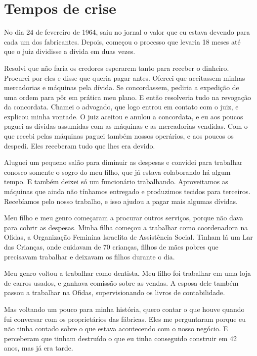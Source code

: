 \chapter{Tempos de crise}

No dia 24 de fevereiro de 1964, saiu no jornal o valor que eu estava
devendo para cada um dos fabricantes. Depois, começou o processo que 
levaria 18 meses até que o juiz dividisse a dívida em duas vezes.

Resolvi que não faria os credores esperarem tanto para receber
o dinheiro. Procurei por eles e disse que queria pagar antes. Ofereci que
aceitassem minhas mercadorias e máquinas pela dívida. Se concordassem, pediria a expedição de uma ordem para pôr em prática meu plano. E então resolveria tudo na revogação da
concordata. Chamei o advogado, que logo entrou em contato com o juiz, e explicou minha vontade. O juiz aceitou e anulou a concordata, e eu aos
poucos paguei as dívidas assumidas com as máquinas e as mercadorias vendidas.
Com o que recebi pelas máquinas paguei também nossos operários, e aos
poucos os despedi. Eles receberam tudo que lhes era devido. 

Aluguei um
pequeno salão para diminuir as despesas e convidei para trabalhar
conosco somente o sogro do
meu filho, que já estava colaborando há algum tempo. E também deixei só um funcionário trabalhando. Aproveitamos as
máquinas que ainda não tínhamos entregado e produzimos tecidos para
terceiros. Recebíamos pelo nosso trabalho, e isso ajudou a pagar mais
algumas dívidas.

Meu filho e meu genro começaram a procurar outros serviços, porque não
dava para cobrir as despesas. Minha filha começou a
trabalhar como coordenadora na Ofidas, a Organização Feminina Israelita de Assistência Social. Tinham lá um Lar das Crianças, onde cuidavam de 70 crianças, filhos de mães
pobres que precisavam trabalhar e deixavam os filhos durante o dia.

Meu genro voltou a trabalhar como dentista. Meu filho foi
trabalhar em uma loja de carros usados, e ganhava comissão sobre as
vendas. A esposa dele também passou a trabalhar na Ofidas,
supervisionando os livros de contabilidade.

Mas voltando um pouco para minha história, quero contar o que houve quando fui
conversar com os proprietários das fábricas. Eles me perguntaram porque
eu não tinha contado sobre o que estava acontecendo com o
nosso negócio. E perceberam que tinham destruído o que eu tinha
conseguido construir em 42 anos, mas já era tarde.

